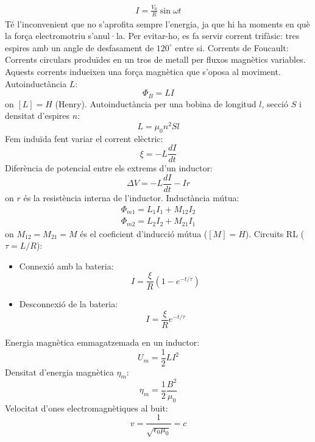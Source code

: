 \documentclass[class=article,10pt,crop=false]{standalone}
\begin{document}
\begin{multicols}{2}
\begin{gather*}
    I=\frac{V_0}{R}\sin\omega t
\end{gather*}
{Té l’inconvenient que no s’aprofita sempre l’energia, ja que hi ha moments en què la força electromotriu s’anul·la. Per evitar-ho, es fa servir corrent trifàsic: tres espires amb un angle de desfasament de $120^\circ$ entre si.}\newline
Corrents de Foucault: Corrents circulars produïdes en un tros de metall per fluxos magnètics variables. Aquests corrents indueixen una força magnètica que s’oposa al moviment.\newline
Autoinductància $L$:
$$\Phi_B=LI$$ {on $[L]=H$ (Henry).}\newline
Autoinductància per una bobina de longitud $l$, secció $S$ i densitat d'espires $n$: $$L=\mu_0n^2Sl$$
Fem induïda fent variar el corrent elèctric: $$\xi=-L\frac{dI}{dt}$$
Diferència de potencial entre els extrems d'un inductor: $$\Delta V=-L\frac{dI}{dt}-Ir$$ {on $r$ és la resistència interna de l'inductor.}\newline
Inductància mútua:
\begin{gather*}
    \Phi_{m1}=L_1I_1+M_{12}I_2\\
    \Phi_{m2}=L_2I_2+M_{21}I_1
\end{gather*}
{on $M_{12}=M_{21}=M$ és el coeficient d'inducció mútua ($[M]=H$).}\newline
Circuits RL ($\tau=L/R$):
\begin{itemize}
    \item Connexió amb la bateria: $$I=\frac{\xi}{R}(1-e^{-t/\tau})$$
    \item Desconnexió de la bateria: $$I=\frac{\xi}{R}e^{-t/\tau}$$
\end{itemize}
Energia magnètica emmagatzemada en un inductor: $$U_m=\frac{1}{2}LI^2$$
Densitat d'energia magnètica $\eta_m$: $$\eta_m=\frac{1}{2}\frac{B^2}{\mu_0}$$
Velocitat d'ones electromagnètiques al buit: $$v=\frac{1}{\sqrt{\epsilon_0\mu_0}}=c$$
\end{multicols}
\end{document}
